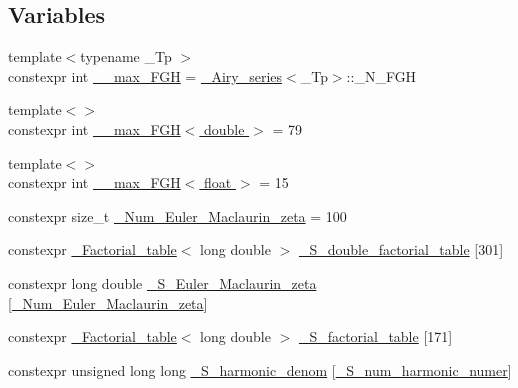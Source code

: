 \subsection*{Variables}
\begin{DoxyCompactItemize}
\item 
{\footnotesize template$<$typename \+\_\+\+Tp $>$ }\\constexpr int \hyperlink{namespacestd_1_1____detail_ae3ef7007b55cd83fa162820c809a2995}{\+\_\+\+\_\+max\+\_\+\+F\+GH} = \hyperlink{classstd_1_1____detail_1_1__Airy__series}{\+\_\+\+Airy\+\_\+series}$<$\+\_\+\+Tp$>$\+::\+\_\+\+N\+\_\+\+F\+GH
\item 
{\footnotesize template$<$$>$ }\\constexpr int \hyperlink{namespacestd_1_1____detail_ac945c3d1897eb356e75d379f67367a4b}{\+\_\+\+\_\+max\+\_\+\+F\+G\+H$<$ double $>$} = 79
\item 
{\footnotesize template$<$$>$ }\\constexpr int \hyperlink{namespacestd_1_1____detail_a67195934ce49105fd7b765e669a5a2a0}{\+\_\+\+\_\+max\+\_\+\+F\+G\+H$<$ float $>$} = 15
\item 
constexpr size\+\_\+t \hyperlink{namespacestd_1_1____detail_ab27e687e1052be7a72de187e0dead124}{\+\_\+\+Num\+\_\+\+Euler\+\_\+\+Maclaurin\+\_\+zeta} = 100
\item 
constexpr \hyperlink{structstd_1_1____detail_1_1__Factorial__table}{\+\_\+\+Factorial\+\_\+table}$<$ long double $>$ \hyperlink{namespacestd_1_1____detail_a6d1131fefdb30b2746c76ff801bdc833}{\+\_\+\+S\+\_\+double\+\_\+factorial\+\_\+table} \mbox{[}301\mbox{]}
\item 
constexpr long double \hyperlink{namespacestd_1_1____detail_acd941b49595dd03e93c88107ad2f68c2}{\+\_\+\+S\+\_\+\+Euler\+\_\+\+Maclaurin\+\_\+zeta} \mbox{[}\hyperlink{namespacestd_1_1____detail_ab27e687e1052be7a72de187e0dead124}{\+\_\+\+Num\+\_\+\+Euler\+\_\+\+Maclaurin\+\_\+zeta}\mbox{]}
\item 
constexpr \hyperlink{structstd_1_1____detail_1_1__Factorial__table}{\+\_\+\+Factorial\+\_\+table}$<$ long double $>$ \hyperlink{namespacestd_1_1____detail_a008b54abe31c1027aefdfd7a76a40e99}{\+\_\+\+S\+\_\+factorial\+\_\+table} \mbox{[}171\mbox{]}
\item 
constexpr unsigned long long \hyperlink{namespacestd_1_1____detail_ad2bdb66d93fa4433097b287c7899cd1e}{\+\_\+\+S\+\_\+harmonic\+\_\+denom} \mbox{[}\hyperlink{namespacestd_1_1____detail_a554788747841f6abbfd7572673df32ad}{\+\_\+\+S\+\_\+num\+\_\+harmonic\+\_\+numer}\mbox{]}

\end{DoxyCompactItemize}
